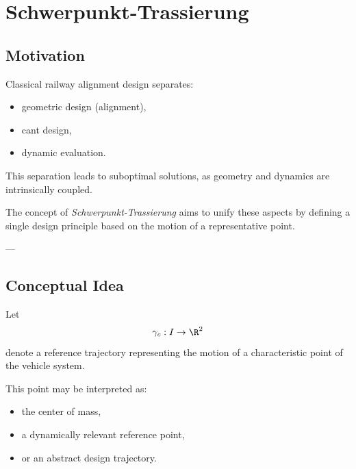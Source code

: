 \chapter{Schwerpunkt-Trassierung}

\section{Motivation}

\begin{remark}
Classical railway alignment design separates:
\begin{itemize}
\item geometric design (alignment),
\item cant design,
\item dynamic evaluation.
\end{itemize}
\end{remark}

\begin{remark}
This separation leads to suboptimal solutions, as geometry and dynamics
are intrinsically coupled.
\end{remark}

\begin{remark}
The concept of \emph{Schwerpunkt-Trassierung} aims to unify these aspects
by defining a single design principle based on the motion of a
representative point.
\end{remark}

---

\section{Conceptual Idea}

\begin{definition}
Let
\[
\gamma_c : I \to \R^2
\]
denote a reference trajectory representing the motion of a
characteristic point of the vehicle system.
\end{definition}

\begin{remark}
This point may be interpreted as:
\begin{itemize}
\item the center of mass,
\item a dynamically relevant reference point,
\item or an abstract design trajectory.
\end{itemize}
\end{remark}

